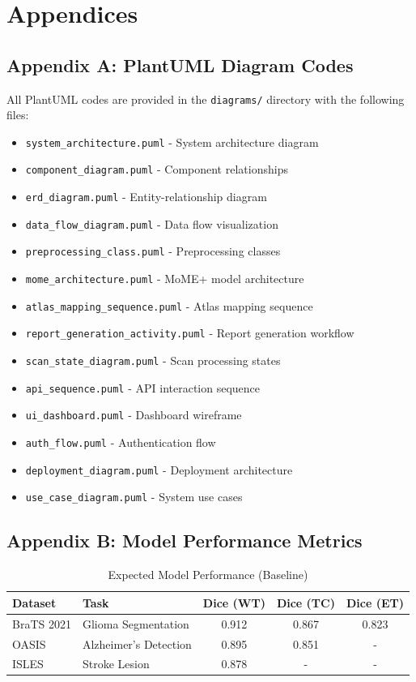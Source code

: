 \documentclass[12pt,a4paper]{article}
\begin{document}
\newpage

\section{Appendices}

\subsection{Appendix A: PlantUML Diagram Codes}

All PlantUML codes are provided in the \texttt{diagrams/} directory with the following files:

\begin{itemize}
    \item \texttt{system\_architecture.puml} - System architecture diagram
    \item \texttt{component\_diagram.puml} - Component relationships
    \item \texttt{erd\_diagram.puml} - Entity-relationship diagram
    \item \texttt{data\_flow\_diagram.puml} - Data flow visualization
    \item \texttt{preprocessing\_class.puml} - Preprocessing classes
    \item \texttt{mome\_architecture.puml} - MoME+ model architecture
    \item \texttt{atlas\_mapping\_sequence.puml} - Atlas mapping sequence
    \item \texttt{report\_generation\_activity.puml} - Report generation workflow
    \item \texttt{scan\_state\_diagram.puml} - Scan processing states
    \item \texttt{api\_sequence.puml} - API interaction sequence
    \item \texttt{ui\_dashboard.puml} - Dashboard wireframe
    \item \texttt{auth\_flow.puml} - Authentication flow
    \item \texttt{deployment\_diagram.puml} - Deployment architecture
    \item \texttt{use\_case\_diagram.puml} - System use cases
\end{itemize}

\subsection{Appendix B: Model Performance Metrics}

\begin{table}[H]
\centering
\begin{tabularx}{\textwidth}{|l|X|c|c|c|}
\hline
\textbf{Dataset} & \textbf{Task} & \textbf{Dice (WT)} & \textbf{Dice (TC)} & \textbf{Dice (ET)} \\
\hline
BraTS 2021 & Glioma Segmentation & 0.912 & 0.867 & 0.823 \\
\hline
OASIS & Alzheimer's Detection & 0.895 & 0.851 & - \\
\hline
ISLES & Stroke Lesion & 0.878 & - & - \\
\hline
\end{tabularx}
\caption{Expected Model Performance (Baseline)}
\end{table}
\end{document}
